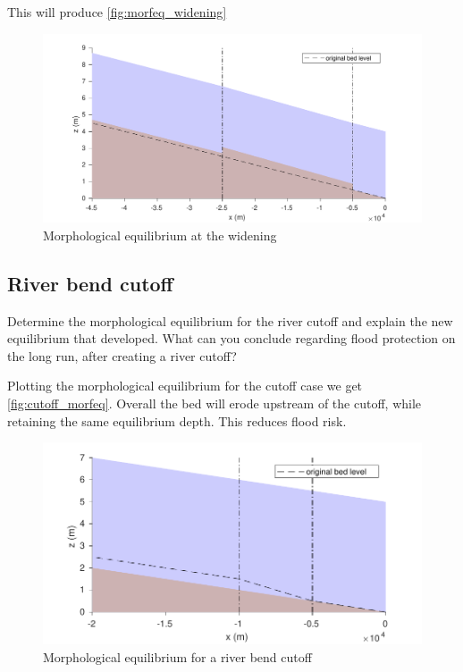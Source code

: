 \documentclass[a4paper]{article}
\begin{document}
This will produce \autoref{fig:morfeq_widening}
\begin{figure}[ht]
  \centering
  \includegraphics[width=\linewidth]{matlab/morfeq_widening.pdf}
  \caption{Morphological equilibrium at the widening}
  \label{fig:morfeq_widening}
\end{figure}

\subsection{River bend cutoff}

\begin{exercise}
  Determine the morphological equilibrium for the river cutoff and explain the new equilibrium that developed. What can you conclude regarding flood protection on the long run, after creating a river cutoff?
\end{exercise}
\begin{solution}
  Plotting the morphological equilibrium for the cutoff case we get \autoref{fig:cutoff_morfeq}. Overall the bed will erode upstream of the cutoff, while retaining the same equilibrium depth. This reduces flood risk.
\begin{figure}
    \centering
    \includegraphics[width=\linewidth]{matlab/cutoff_morfeq.pdf}
    \caption{Morphological equilibrium for a river bend cutoff}
    \label{fig:cutoff_morfeq}
\end{figure}

\end{solution}
\end{document}
